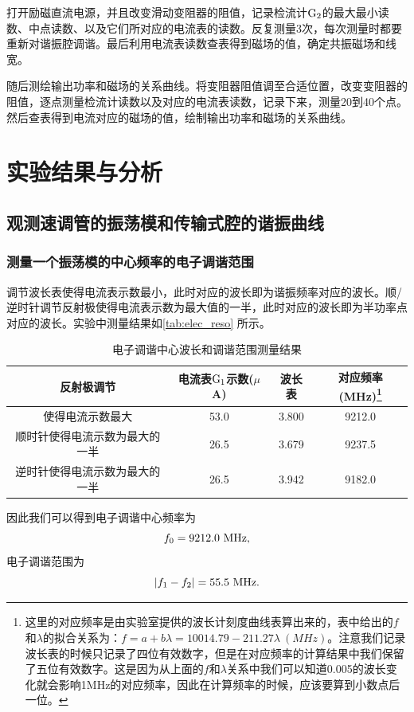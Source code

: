 \documentclass[font=default]{mpltx}
\begin{document}
打开励磁直流电源，并且改变滑动变阻器的阻值，记录检流计$\rm G_2$的最大最小读数、中点读数、以及它们所对应的电流表的读数。反复测量3次，每次测量时都要重新对谐振腔调谐。最后利用电流表读数查表得到磁场的值，确定共振磁场和线宽。

随后测绘输出功率和磁场的关系曲线。将变阻器阻值调至合适位置，改变变阻器的阻值，逐点测量检流计读数以及对应的电流表读数，记录下来，测量20到40个点。然后查表得到电流对应的磁场的值，绘制输出功率和磁场的关系曲线。

\section{实验结果与分析}
\subsection{观测速调管的振荡模和传输式腔的谐振曲线}
\subsubsection{测量一个振荡模的中心频率的电子调谐范围}
调节波长表使得电流表示数最小，此时对应的波长即为谐振频率对应的波长。顺/逆时针调节反射极使得电流表示数为最大值的一半，此时对应的波长即为半功率点对应的波长。实验中测量结果如\autoref{tab:elec_reso} 所示。
\begin{table}[h]
  \label{tab:elec_reso}
  \caption{电子调谐中心波长和调谐范围测量结果}
  \vspace{0.2cm}
  \begin{tabular}{c|c|c|c}
    \hline
  反射极调节           & 电流表$\rm G_1$示数($\mu$A) & 波长表   & 对应频率(MHz)\footnote{这里的对应频率是由实验室提供的波长计刻度曲线表算出来的，表中给出的$f$和$\lambda$的拟合关系为：$f=a+b\lambda=10014.79-211.27\lambda\ (MHz)$。注意我们记录波长表的时候只记录了四位有效数字，但是在对应频率的计算结果中我们保留了五位有效数字。这是因为从上面的$f$和$\lambda$关系中我们可以知道0.005的波长变化就会影响1MHz的对应频率，因此在计算频率的时候，应该要算到小数点后一位。} \\\hline\hline
  使得电流示数最大        & 53.0  & 3.800 & 9212.0 \\\hline
  顺时针使得电流示数为最大的一半 & 26.5  & 3.679 & 9237.5 \\\hline
  逆时针使得电流示数为最大的一半 & 26.5  & 3.942 & 9182.0 \\\hline
  \end{tabular}
\end{table}

因此我们可以得到电子调谐中心频率为$$f_0=9212.0\ \rm MHz,$$电子调谐范围为$$|f_1-f_2|=55.5\ \rm MHz.$$
\end{document}
